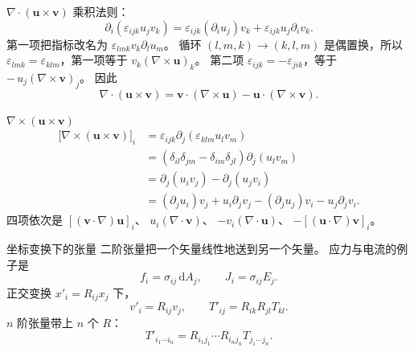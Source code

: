 \documentclass[fontset=windows, chinese, 10pt, xcolor=dvipsnames]{beamer}
\begin{document}
\begin{frame}{$\nabla\cdot(\mathbf{u}\times\mathbf{v})$}
  乘积法则：
  \begin{equation*}
    \partial_i(\varepsilon_{ijk}u_j v_k)
    =\varepsilon_{ijk}(\partial_i u_j)v_k
    +\varepsilon_{ijk}u_j\partial_i v_k.
  \end{equation*}
  第一项把指标改名为 $\varepsilon_{lmk}v_k\partial_l u_m$。
  循环 $(l,m,k)\to(k,l,m)$ 是偶置换，所以
  $\varepsilon_{lmk}=\varepsilon_{klm}$，第一项等于
  $v_k(\nabla\times\mathbf{u})_k$。
  第二项 $\varepsilon_{ijk}=-\varepsilon_{jik}$，等于
  $-\,u_j(\nabla\times\mathbf{v})_j$。
  因此
  \begin{equation*}
    \nabla\cdot(\mathbf{u}\times\mathbf{v})
    =\mathbf{v}\cdot(\nabla\times\mathbf{u})
    -\mathbf{u}\cdot(\nabla\times\mathbf{v}).
  \end{equation*}
\end{frame}

\begin{frame}{$\nabla\times(\mathbf{u}\times\mathbf{v})$}
  \small
  \begin{align*}
    \bigl[\nabla\times(\mathbf{u}\times\mathbf{v})\bigr]_i
    &= \varepsilon_{ijk}\partial_j(\varepsilon_{klm}u_l v_m) \\
    &= (\delta_{il}\delta_{jm}-\delta_{im}\delta_{jl})
       \partial_j(u_l v_m) \\
    &= \partial_j(u_i v_j)-\partial_j(u_j v_i) \\
    &= (\partial_j u_i)v_j+u_i\partial_j v_j
     - (\partial_j u_j)v_i-u_j\partial_j v_i.
  \end{align*}
  \normalsize
  四项依次是
  $[(\mathbf{v}\cdot\nabla)\mathbf{u}]_i$、
  $u_i(\nabla\cdot\mathbf{v})$、
  $-v_i(\nabla\cdot\mathbf{u})$、
  $-[(\mathbf{u}\cdot\nabla)\mathbf{v}]_i$。
\end{frame}

\begin{frame}{坐标变换下的张量}
  二阶张量把一个矢量线性地送到另一个矢量。
  应力与电流的例子是
  \begin{equation*}
    f_i=\sigma_{ij}\,\mathrm{d}A_j,
    \qquad
    J_i=\sigma_{ij}E_j.
  \end{equation*}
  正交变换 $x'_i=R_{ij}x_j$ 下，
  \begin{equation*}
    v'_i=R_{ij}v_j,
    \qquad
    T'_{ij}=R_{ik}R_{jl}T_{kl}.
  \end{equation*}
  $n$ 阶张量带上 $n$ 个 $R$：
  \begin{equation*}
    T'_{i_1\cdots i_n}
    =R_{i_1 j_1}\cdots R_{i_n j_n}
     T_{j_1\cdots j_n}.
  \end{equation*}
\end{frame}
\end{document}
